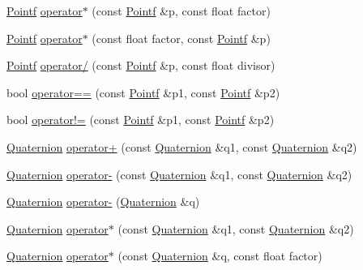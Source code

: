 \begin{DoxyCompactItemize}
\item 
\hyperlink{classprism_1_1_pointf}{Pointf} \hyperlink{namespaceprism_ade1984e58679ef4d8fcdd37726ee6483}{operator$\ast$} (const \hyperlink{classprism_1_1_pointf}{Pointf} \&p, const float factor)
\item 
\hyperlink{classprism_1_1_pointf}{Pointf} \hyperlink{namespaceprism_a409aa6b61b79f029d78f6d4c3aba2df5}{operator$\ast$} (const float factor, const \hyperlink{classprism_1_1_pointf}{Pointf} \&p)
\item 
\hyperlink{classprism_1_1_pointf}{Pointf} \hyperlink{namespaceprism_a71504f6dd299e8bc788e07d11d29dc5e}{operator/} (const \hyperlink{classprism_1_1_pointf}{Pointf} \&p, const float divisor)
\item 
bool \hyperlink{namespaceprism_a13ab889958edc08eea9a5bea056cd9c1}{operator==} (const \hyperlink{classprism_1_1_pointf}{Pointf} \&p1, const \hyperlink{classprism_1_1_pointf}{Pointf} \&p2)
\item 
bool \hyperlink{namespaceprism_ae010d5880eb7bcf5119f006e26bf473f}{operator!=} (const \hyperlink{classprism_1_1_pointf}{Pointf} \&p1, const \hyperlink{classprism_1_1_pointf}{Pointf} \&p2)
\item 
\hyperlink{classprism_1_1_quaternion}{Quaternion} \hyperlink{namespaceprism_ad81bceaddc25922e571b4bf427ffe296}{operator+} (const \hyperlink{classprism_1_1_quaternion}{Quaternion} \&q1, const \hyperlink{classprism_1_1_quaternion}{Quaternion} \&q2)
\item 
\hyperlink{classprism_1_1_quaternion}{Quaternion} \hyperlink{namespaceprism_a5eae37b5dc73c544572686f215cea89d}{operator-\/} (const \hyperlink{classprism_1_1_quaternion}{Quaternion} \&q1, const \hyperlink{classprism_1_1_quaternion}{Quaternion} \&q2)
\item 
\hyperlink{classprism_1_1_quaternion}{Quaternion} \hyperlink{namespaceprism_ae04c2e5eae2242c58a967086ecad8ff4}{operator-\/} (\hyperlink{classprism_1_1_quaternion}{Quaternion} \&q)
\item 
\hyperlink{classprism_1_1_quaternion}{Quaternion} \hyperlink{namespaceprism_a74c3eeec91c3a178711b6f05a5487d70}{operator$\ast$} (const \hyperlink{classprism_1_1_quaternion}{Quaternion} \&q1, const \hyperlink{classprism_1_1_quaternion}{Quaternion} \&q2)
\item 
\hyperlink{classprism_1_1_quaternion}{Quaternion} \hyperlink{namespaceprism_a45806b1a58ec5aae0db87d399d4d832b}{operator$\ast$} (const \hyperlink{classprism_1_1_quaternion}{Quaternion} \&q, const float factor)
\item 

\end{DoxyCompactItemize}
